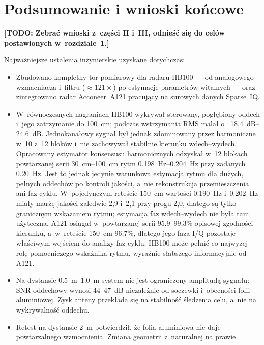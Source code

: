 \documentclass[12pt,a4paper,oneside]{report}
\newcommand{\todo}[1]{\textcolor{red!75!black}{\textbf{[TODO: #1]}}}
\begin{document}
\chapter{Podsumowanie i wnioski końcowe}

\todo{Zebrać wnioski z~części II i~III, odnieść się do celów postawionych
w~rozdziale~1.}

Najważniejsze ustalenia inżynierskie uzyskane dotychczas:
\begin{itemize}
  \item Zbudowano kompletny tor pomiarowy dla radaru HB100 --- od analogowego
  wzmacniacza i~filtru ($\approx121\times$) po estymację parametrów witalnych
  --- oraz zintegrowano radar Acconeer~A121 pracujący na surowych danych
  Sparse~IQ.
  \item W~równoczesnych nagraniach HB100 wykrywał sterowany, pogłębiony oddech
  i~jego zatrzymanie do \SI{100}{cm}; podczas wstrzymania RMS malał o~
  \SIrange{18.4}{24.6}{dB}. Jednokanałowy sygnał był jednak zdominowany przez
  harmoniczne w~10 z~12 bloków i~nie zachowywał stabilnie kierunku
  wdech--wydech. Opracowany estymator konsensusu harmonicznych odzyskał
  w~12 blokach powtarzanej serii \SIrange{30}{100}{cm} rytm
  \SIrange{0.198}{0.204}{Hz} przy zadanych \SI{0.20}{Hz}. Jest to jednak
  jedynie warunkowa estymacja rytmu dla dużych, pełnych oddechów po kontroli
  jakości, a~nie rekonstrukcja przemieszczenia ani faz cyklu. W~pojedynczym
  reteście \SI{150}{cm} wartości \SI{0.190}{Hz} i~\SI{0.202}{Hz} miały
  marżę jakości zaledwie 2,9 i~2,1 przy progu 2,0, dlatego są tylko
  granicznym wskazaniem rytmu; estymacja faz wdech--wydech nie była tam
  użyteczna. A121 osiągał w~powtarzanej serii 95,9--99,3\% opisowej zgodności
  kierunku, a~w~reteście \SI{150}{cm} 96,7\%, dlatego jego faza I/Q pozostaje
  właściwym wejściem do analizy faz cyklu. HB100 może pełnić co najwyżej rolę
  pomocniczego wskaźnika rytmu, wyraźnie słabszego informacyjnie od A121.
  \item Na dystansie \SIrange{0.5}{1.0}{m} system nie jest ograniczony
  amplitudą sygnału: SNR oddechowy wynosi 44--47~dB niezależnie od soczewki
  i~obecności folii aluminiowej. Zysk anteny przekłada się na stabilność
  śledzenia celu, a~nie na wykrywalność oddechu.
  \item Retest na dystansie \SI{2}{m} potwierdził, że folia aluminiowa nie
  daje powtarzalnego wzmocnienia. Zmiana geometrii z~naturalnej na prawie

\end{itemize}
\end{document}
